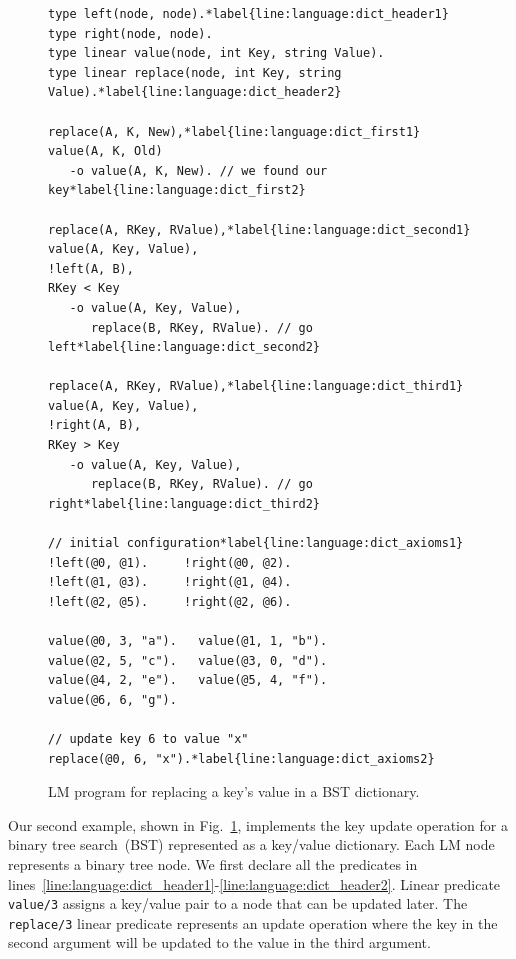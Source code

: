 
\begin{figure}[ht]
\begin{Verbatim}[numbers=right,fontsize=\codesize,commandchars=\*\{\}]
type left(node, node).*label{line:language:dict_header1}
type right(node, node).
type linear value(node, int Key, string Value).
type linear replace(node, int Key, string Value).*label{line:language:dict_header2}

replace(A, K, New),*label{line:language:dict_first1}
value(A, K, Old)
   -o value(A, K, New). // we found our key*label{line:language:dict_first2}

replace(A, RKey, RValue),*label{line:language:dict_second1}
value(A, Key, Value),
!left(A, B),
RKey < Key
   -o value(A, Key, Value),
      replace(B, RKey, RValue). // go left*label{line:language:dict_second2}

replace(A, RKey, RValue),*label{line:language:dict_third1}
value(A, Key, Value),
!right(A, B),
RKey > Key
   -o value(A, Key, Value),
      replace(B, RKey, RValue). // go right*label{line:language:dict_third2}

// initial configuration*label{line:language:dict_axioms1}
!left(@0, @1).     !right(@0, @2).
!left(@1, @3).     !right(@1, @4). 
!left(@2, @5).     !right(@2, @6).

value(@0, 3, "a").   value(@1, 1, "b").
value(@2, 5, "c").   value(@3, 0, "d").
value(@4, 2, "e").   value(@5, 4, "f").
value(@6, 6, "g").

// update key 6 to value "x"
replace(@0, 6, "x").*label{line:language:dict_axioms2}
\end{Verbatim}
\caption{LM program for replacing a key's value in a BST dictionary.}
\label{code:btree_replace}
\end{figure}

Our second example, shown in Fig.~\ref{code:btree_replace}, implements the key
update operation for a binary tree search~(BST) represented as a key/value
dictionary. Each LM node represents a binary tree node. We first declare all the
predicates in
lines~\ref{line:language:dict_header1}-\ref{line:language:dict_header2}.
Linear
predicate \texttt{value/3} assigns a key/value pair to a node that can be
updated later.  The \texttt{replace/3} linear predicate represents an update
operation where the key in the second argument will be updated to the value in
the third argument.

